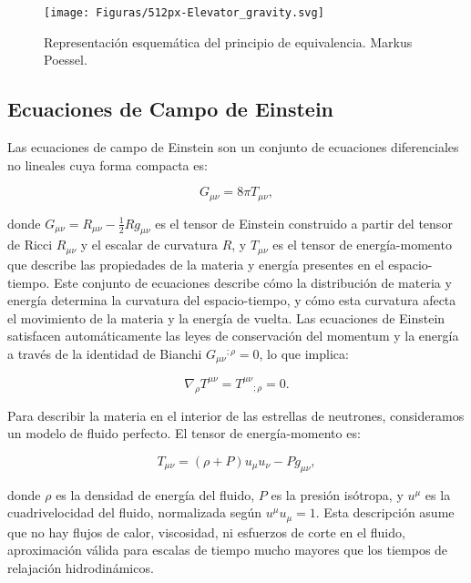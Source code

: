 \begin{figure}[h]
	\centering
	\texttt{[image: Figuras/512px-Elevator\_gravity.svg]}
	\caption{Representación esquemática del principio de equivalencia. Markus Poessel.}
	\label{fig:equivalence_principle}
\end{figure}

\subsection{Ecuaciones de Campo de Einstein}

Las ecuaciones de campo de Einstein son un conjunto de ecuaciones diferenciales no lineales cuya forma compacta es:

\begin{equation}
	G_{\mu\nu} = 8\pi T_{\mu\nu},
	\label{eq:einstein_field}
\end{equation}

donde $G_{\mu\nu} = R_{\mu\nu} - \frac{1}{2}Rg_{\mu\nu}$ es el tensor de Einstein construido a partir del tensor de Ricci $R_{\mu\nu}$ y el escalar de curvatura $R$, y $T_{\mu\nu}$ es el tensor de energía-momento que describe las propiedades de la materia y energía presentes en el espacio-tiempo. Este conjunto de ecuaciones describe cómo la distribución de materia y energía determina la curvatura del espacio-tiempo, y cómo esta curvatura afecta el movimiento de la materia y la energía de vuelta. Las ecuaciones de Einstein satisfacen automáticamente las leyes de conservación del momentum y la energía a través de la identidad de Bianchi $G_{\mu\nu}{}^{;\rho} = 0$, lo que implica:

\begin{equation}
	\nabla_\rho T^{\mu\nu} = T^{\mu\nu}{}_{;\rho} = 0.
\end{equation}

Para describir la materia en el interior de las estrellas de neutrones, consideramos un modelo de fluido perfecto. El tensor de energía-momento es:

\begin{equation}
	T_{\mu\nu} = (\rho + P)u_\mu u_\nu - Pg_{\mu\nu},
	\label{eq:tensor_fluido_perfecto}
\end{equation}

donde $\rho$ es la densidad de energía del fluido, $P$ es la presión isótropa, y $u^\mu$ es la cuadrivelocidad del fluido, normalizada según $u^\mu u_\mu = 1$. Esta descripción asume que no hay flujos de calor, viscosidad, ni esfuerzos de corte en el fluido, aproximación válida para escalas de tiempo mucho mayores que los tiempos de relajación hidrodinámicos.

